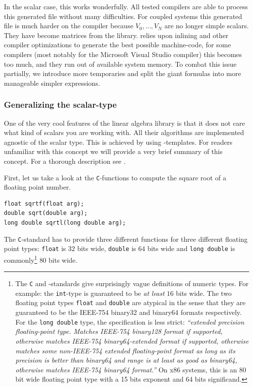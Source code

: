 In the scalar case, this works wonderfully. All tested compilers are able to process this generated file without many difficulties. For coupled systems this generated file is much harder on the compiler because $V_0, \dots, V_N$ are no longer simple scalars. They have become matrices from the \Eigen{} library. \Eigen{} relies upon inlining and other compiler optimizations to generate the best possible machine-code, for some compilers (most notably for the Microsoft Visual Studio compiler) this becomes too much, and they run out of available system memory. To combat this issue partially, we introduce more temporaries and split the giant formulas into more manageable simpler expressions.

\subsubsection{Generalizing the scalar-type}

One of the very cool features of the linear algebra library \Eigen is that it does not care what kind of scalars you are working with. All their algorithms are implemented agnostic of the scalar type. This is achieved by using \cpp{}-templates. For readers unfamiliar with this concept we will provide a very brief summary of this concept. For a thorough description see \cite[Chapter~23]{stroustrup_programming_2013}.

First, let us take a look at the \texttt{C}-functions to compute the square root of a floating point number.
\begin{verbatim}
float sqrtf(float arg);
double sqrt(double arg);
long double sqrtl(long double arg);
\end{verbatim}

The \texttt{C}-standard has to provide three different functions for three different floating point types: \texttt{float} is $32$ bits wide, \texttt{double} is $64$ bits wide and \texttt{long double} is commonly\footnote{The \texttt{C} and \cpp-standards give surprisingly vague definitions of numeric types. For example: the \texttt{int}-type is guaranteed to be \emph{at least} $16$ bits wide. The two floating point types \texttt{float} and \texttt{double} are atypical in the sense that they are guaranteed to be the IEEE-754 binary32 and binary64 formats respectively. For the \texttt{long double} type, the specification is less strict: \emph{``extended precision floating-point type. Matches IEEE-754 binary128 format if supported, otherwise matches IEEE-754 binary64-extended format if supported, otherwise matches some non-IEEE-754 extended floating-point format as long as its precision is better than binary64 and range is at least as good as binary64, otherwise matches IEEE-754 binary64 format.''} On x86 systems, this is an $80$ bit wide floating point type with a 15 bits exponent and 64 bits significand.} $80$ bits wide.

